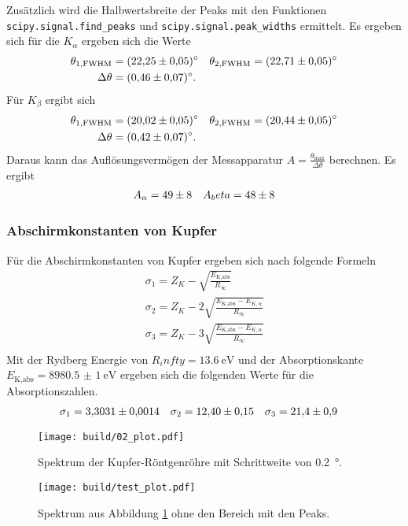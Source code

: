 Zusätzlich wird die Halbwertsbreite der Peaks mit den Funktionen \texttt{scipy.signal.find\_peaks}  und \texttt{scipy.signal.peak\_widths} \cite{scipy} ermittelt.
Es ergeben sich für die $K_\alpha$ ergeben sich die Werte
\begin{align*}
    \theta_{1,\text{FWHM}} &= \qty{22.25 \pm 0.05}{\degree} & \theta_{2,\text{FWHM}} = \qty{22.71 \pm 0.05}{\degree} \\
    \Delta \theta &= \qty{0.46 \pm 0.07}{\degree}.
\end{align*}
Für $K_\beta$ ergibt sich
\begin{align*}
    \theta_{1,\text{FWHM}} &= \qty{20.02 \pm 0.05}{\degree} & \theta_{2,\text{FWHM}} = \qty{20.44 \pm 0.05}{\degree} \\
    \Delta \theta &= \qty{0.42 \pm 0.07}{\degree}.
\end{align*}
Daraus kann das Auflösungsvermögen der Messapparatur $A= \frac{\theta_\text{max}}{\Delta \theta}$ berechnen.
Es ergibt
\begin{align*}
    A_\alpha &= \num{49 \pm 8} & A_beta = \num{48 \pm 8}
\end{align*}

\subsubsection{Abschirmkonstanten von Kupfer}
Für die Abschirmkonstanten von Kupfer ergeben sich nach \cite{man:v602} folgende Formeln
\begin{align}
    \sigma_1 = Z_K -\sqrt{\frac{E_\text{K,abs}}{R_\infty}}\\
    \sigma_2 = Z_K -2\sqrt{\frac{E_\text{K,abs}- E_{K,\alpha} }{R_\infty}}\\
    \sigma_3 = Z_K -3\sqrt{\frac{E_\text{K,abs}- E_{K,\alpha} }{R_\infty}}\\
\end{align}
Mit der Rydberg Energie von $R_infty = \qty{13.6}{\eV}$ und der Absorptionskante $E_\text{K,abs} = \qty{8980.5(10)}{\eV}$ \cite{x-ray}
ergeben sich die folgenden Werte für die Absorptionszahlen.
\begin{align}
    \sigma_1 &= \num{3.3031 \pm 0.0014} &
    \sigma_2 &= \num{12.40 \pm 0.15} &
    \sigma_3 &= \num{21.4 \pm 0.9}
\end{align}



\begin{figure}
    \centering
    \texttt{[image: build/02\_plot.pdf]}
    \caption{Spektrum der Kupfer-Röntgenröhre mit Schrittweite von \qty{0.2}{\degree}.}
    \label{fig:02}
\end{figure}
\begin{figure}
    \centering
    \texttt{[image: build/test\_plot.pdf]}
    \caption{Spektrum aus Abbildung \ref{fig:02} ohne den Bereich mit den Peaks.}
    \label{fig:test}
\end{figure}

